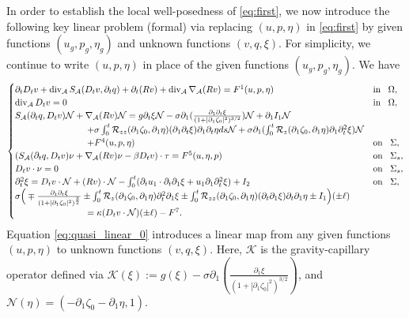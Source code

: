 \documentclass[letterpaper,reqno,10pt,twoside]{amsart}
\theoremstyle{definition}
\theoremstyle{remark}
\def\p{\partial}
\def\dive{\mathop{\rm div}\nolimits}
\begin{document}
	In order to establish the local well-posedness of \eqref{eq:first}, we now introduce
	the following key linear problem (formal) via replacing $(u,p,\eta)$ in \eqref{eq:first} by given functions $(u_g,p_g,\eta_g)$ and unknown functions $(v,q,\xi)$. For simplicity, we continue to write $(u,p,\eta)$ in place of the given functions $(u_g,p_g,\eta_g)$. We have
	\begin{equation}\label{eq:quasi_linear_0}
		\begin{cases}
			\partial_{t}D_{t}v+\operatorname{div}_{\mathcal{A}}S_{\mathcal{A}}(D_{t}v,\p_{t}q)+\p_{t}(Rv)+\dive_{\mathcal{A}}\nabla_{\mathcal{A}}(Rv)=F^{1}(u,p,\eta)~~~&\operatorname{in}~~\Omega,\\
			\operatorname{div}_{\mathcal{A}}D_{t}v=0~~~&\operatorname{in}~~\Omega,\\
			S_{\mathcal{A}}(\p_{t}q,D_{t}v)\mathcal{N}+\nabla_{\mathcal{A}}(Rv)\mathcal{N}=g\p_{t}\xi\mathcal{N}-\sigma\partial_{1}(\frac{\p_1\p_t\xi}{(1+\vert \partial_{1}\zeta_{0}\vert^{2})^{3/2}})\mathcal{N}+\p_{1}I_{1}\mathcal{N}\\
			\quad\quad\quad\quad\quad\quad\quad\quad+\sigma\int_{0}^{t}\mathcal{R}_{zz}(\p_{1}\zeta_{0},\p_{1}\eta)(\p_{1}\p_{t}\xi)\p_{1}\p_{t}\eta ds\mathcal{N}+\sigma\partial_{1}(\int_{0}^{t}\mathcal{R}_{z}(\partial_{1}\zeta_{0},\partial_{1}\eta)\partial_{1}\partial_{t}^{2}\xi)\mathcal{N}\\
			\quad\quad\quad\quad\quad\quad\quad\quad+F^{4}(u,p,\eta)~~~&\operatorname{on}~~\Sigma,\\
			(S_{\mathcal{A}}(\p_{t}q,D_{t}v)\nu+\nabla_{\mathcal{A}}(Rv)\nu-\beta D_{t}v)\cdot \tau=F^{5}(u,\eta,p)~~~&\operatorname{on}~~\Sigma_{s},\\
			D_{t}v\cdot \nu=0~~~&\operatorname{on}~~\Sigma_{s},\\
			\partial_{t}^{2}\xi=D_{t}v\cdot \mathcal{N}+(Rv)\cdot \mathcal{N} - \int_{0}^{t}(\partial_{t}u_{1}\cdot\partial_{t}\p_{1}\xi+u_{1}\partial_{1}\partial_{t}^{2}\xi)+I_{2}~~~&\operatorname{on}~~\Sigma,\\
			\sigma\Big(\mp \frac{\partial_{1}\p_{t}\xi}{(1+\vert \partial_{1}\zeta_{0}\vert^{2})^{\frac{3}{2}}}\pm \int_{0}^{t}\mathcal{R}_{z}(\partial_{1}\zeta_{0},\partial_{1}\eta)\partial_{t}^{2}\partial_{1}\xi \pm\int_{0}^{t}\mathcal{R}_{zz}(\p_{1}\zeta_{0},\p_{1}\eta)(\p_{t}\p_{1}\xi)\p_{t}\p_{1}\eta \pm I_{1} \Big)(\pm \ell)\\
			\quad\quad\quad\quad\quad\quad\quad\quad=\kappa (D_{t}v\cdot \mathcal{N})(\pm \ell)-{F}^{7}.
		\end{cases}
	\end{equation}
	\noindent  Equation \eqref{eq:quasi_linear_0} introduces a linear map from any given functions $(u,p,\eta)$ to unknown functions $(v,q,\xi)$. Here, $\mathcal{K}$ is the gravity-capillary operator defined via $\mathcal{K}(\xi):=g(\xi)-\sigma\p_1\left(\frac{\p_1\xi}{(1+|\p_1\zeta_0|^2)^{3/2}}\right)$, and $\mathcal{N}(\eta)=(-\p_1\zeta_0-\partial_{1}\eta, 1)$. 
	
\end{document}

